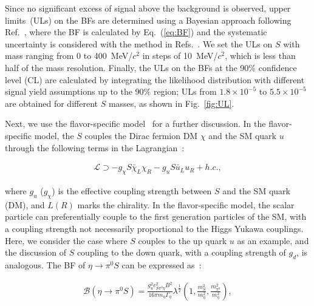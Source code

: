 \documentclass[
 reprint,
 amsmath,amssymb,a
 aps,
 twocolumn
]{revtex4-2}
\begin{document}
Since no significant excess of signal above the background is observed, upper limits~(ULs) on the BFs are determined using a Bayesian approach following Ref.~\cite{BESIII:2023fqz}, where the BF is calculated by Eq.~(\ref{eq:BF}) and the systematic uncertainty is considered with the method in Refs.~\cite{Liu:2015uha,Stenson:2006gwf}. We set the ULs on $S$ with mass ranging from 0 to 400~MeV/$c^2$ in steps of 10~MeV/$c^2$, which is less than half of the mass resolution.
Finally, the ULs on the BFs at the 90\% confidence level (CL) are calculated by integrating the likelihood distribution with different signal yield assumptions up to the 90\% region; ULs from $1.8\times10^{-5}$ to $5.5\times10^{-5}$ are obtained for different $S$ masses, as shown in Fig.~\ref{fig:UL}.

Next, we use the flavor-specific model~\cite{Batell:2018fqo,Delaunay:2025lhl,Batell:2017kty,Batell:2021xsi} for a further discussion.
In the flavor-specific model, the $S$ couples the Dirac fermion DM $\chi$ and the SM quark $u$ through the following terms in the Lagrangian~\cite{Batell:2018fqo}:

\begin{eqnarray}
\mathcal{L} \supset -g_{\chi} S \bar{\chi}_L \chi_R - g_u S \bar{u}_L u_R + h.c.,
\label{eq:operator}
\end{eqnarray}

where $g_u$ ($g_\chi$) is the effective coupling strength between $S$ and the SM quark (DM), and $L(R)$ marks the chirality.
In the flavor-specific model, the scalar particle can preferentially couple to the first generation particles of the SM, with a coupling strength not necessarily proportional to the Higgs Yukawa couplings.
Here, we consider the case where $S$ couples to the up quark $u$ as an example, and the discussion of $S$ coupling to the down quark, with a coupling strength of $g_d$, is analogous.
The BF of $\eta\to\pi^0S$ can be expressed as~\cite{Batell:2018fqo}:

\begin{eqnarray}
\mathcal{B}(\eta\to\pi^0S)=\frac{ g^2_u c^2_{S\pi^0\eta } B^2}{ 16\pi m_\eta \Gamma_\eta } \lambda^{\frac{1}{2}}(1, \frac{m^2_S}{m^2_{\eta}}, \frac{m^2_{\pi^0}}{m^2_{\eta}}),
\label{eq:BF_the}
\end{eqnarray}
\end{document}

